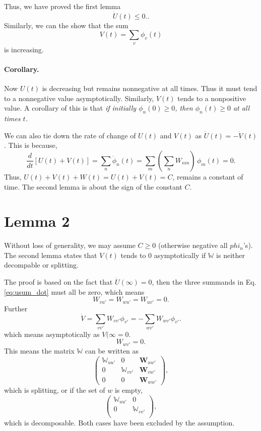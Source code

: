 \documentclass{book}
\numberwithin{equation}{section}
\theoremstyle{plain}
\theoremstyle{definition}
\theoremstyle{remark}
\theoremstyle{BoldStyle}
\numberwithin{exercise}{section}
\begin{document}
Thus, we have proved the first lemma
%
\begin{equation}
  \dot U(t) \le 0.
  \label{eq:dotusum_le_0}.
\end{equation}
%
Similarly, we can the show that the sum
%
\begin{equation}
  V(t) = \sum_v \phi_v(t)
  \label{eq:phi_vsum}
\end{equation}
%
is increasing.


\paragraph{Corollary.}


Now $U(t)$ is decreasing but remains nonnegative at all times.
%
Thus it must tend to a nonnegative value asymptotically.
%
Similarly, $V(t)$ tends to a nonpositive value.
%
A corollary of this is that
\emph{
  if initially $\phi_n(0) \ge 0$,
  then $\phi_n(t) \ge 0$ at all times $t$.
}



We can also tie down the rate of change of $U(t)$ and $V(t)$
as $\dot U(t) = -\dot V(t)$.
%
This is because,
$$
\frac{d}{dt} \left[ U(t) + V(t) \right]
=
\sum_n \dot \phi_n(t)
=
\sum_m \left( \sum_n W_{nm} \right) \, \phi_m(t)
= 0.
$$
Thus,
$U(t) + V(t) + W(t) = U(t) + V(t) = C$,
remains a constant of time.
%
The second lemma is about the sign of the constant $C$.



\section{Lemma 2}



Without loss of generality,
we may assume $C \ge 0$ (otherwise negative all $phi_n$'s).
%
The second lemma states that
$V(t)$ tends to $0$ asymptotically
if $\mathbb W$ is neither decompable or splitting.

The proof is based on the fact that
$\dot U(\infty) = 0$,
then the three summands in Eq. \eqref{eq:usum_dot}
must all be zero,
which means
$$
W_{v u'} = W_{w u'} = W_{u v'} = 0.
$$
Further
$$
\dot V = \sum_{vv'} W_{v v'} \phi_{v'}
= - \sum_{wv'} W_{w v'} \phi_{v'}.
$$
which means asymptotically as $V(\infty = 0$.
$$
W_{w v'} = 0.
$$
This means the matrix $\mathbb W$ can be written as
$$
\left(
  \begin{array}{cccccc}
    \mathbb W_{u u'} &  0                 & \mathbf W_{u w'} \\
    0                &  \mathbb W_{v v'}  & \mathbf W_{v w'} \\
    0                &  0                 & \mathbf W_{w w'}
  \end{array}
\right),
$$
which is splitting,
or if the set of $w$ is empty,
$$
\left(
  \begin{array}{cccccc}
    \mathbb W_{u u'} &  0                \\
    0                &  \mathbb W_{v v'} \\
  \end{array}
\right),
$$
which is decomposable.
%
Both cases have been excluded by the assumption.
\end{document}
